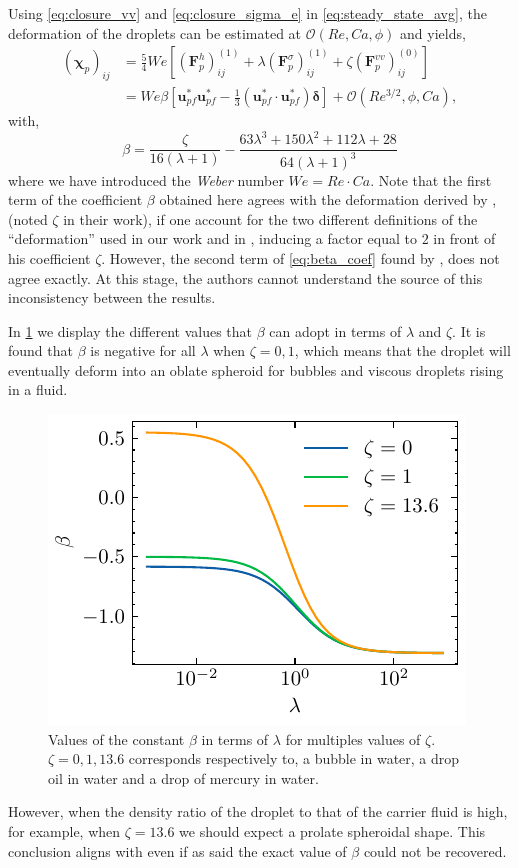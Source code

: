 Using \ref{eq:closure_vv} and \ref{eq:closure_sigma_e} in  \ref{eq:steady_state_avg}, the deformation of the droplets can be estimated at $\mathcal{O}(Re,Ca,\phi)$ and yields, 
\begin{align}
    (\bm\chi_{p})_{ij}
    &= 
    \frac{5}{4}We \left[
        (\textbf{F}_p^h )_{ij}^{(1)}
        + \lambda (\textbf{F}_p^{\sigma})_{ij}^{(1)}
        + \zeta (\textbf{F}_p^{vv})_{ij}^{(0)}
    \right]
    \label{eq:deformation_final1}
    \\
    &= We \beta [\textbf{u}_{pf}^*\textbf{u}_{pf}^* - \frac{1}{3}(\textbf{u}_{pf}^*\cdot \textbf{u}_{pf}^*)\bm\delta ]
    + \mathcal{O}(Re^{3/2},\phi,Ca),
    \label{eq:deformation_final}
\end{align}
with, 
\begin{equation}
    \beta = 
    \frac{\zeta}{16 \left(\lambda + 1\right)} 
    - \frac{63 \lambda^{3} + 150 \lambda^{2} + 112 \lambda + 28}{64 \left(\lambda + 1\right)^{3}}
    \label{eq:beta_coef}
\end{equation}
where we have introduced the \textit{Weber} number $We = Re \cdot Ca$. 
Note that the first term of the coefficient $\beta$ obtained here agrees with the deformation derived by \citet{taylor1964deformation}, (noted $\zeta$ in their work), if one account for the two different definitions of the ``deformation'' used in our work and in \citet{taylor1964deformation}, inducing a factor equal to $2$ in front of his coefficient $\zeta$.
However, the second term of \ref{eq:beta_coef} found by \citet{taylor1964deformation}, does not agree exactly.
At this stage, the authors cannot understand the source of this inconsistency between the results.

In \ref{fig:beta} we display the different values that $\beta$ can adopt in terms of $\lambda$ and $\zeta$. 
It is found that $\beta$ is negative for all $\lambda$ when  $\zeta = 0, 1$, which means that the droplet will eventually deform into an oblate spheroid for bubbles and viscous droplets rising in a fluid. 
\begin{figure}[h!]
    \centering
    \includegraphics[height=0.25\textwidth]{image/Theory/beta.pdf}
    \caption{Values of the constant $\beta$ in terms of $\lambda$ for multiples values of $\zeta$. 
    $\zeta = 0,1,13.6$ corresponds respectively to, a bubble in water, a drop oil in water and a drop of mercury in water. }
    \label{fig:beta}
\end{figure}
However, when the density ratio of the droplet to that of the carrier fluid is high, for example, when $\zeta = 13.6$ we should expect a prolate spheroidal shape. 
This conclusion aligns with \citet{taylor1964deformation} even if as said the exact value of $\beta$ could not be recovered. 

